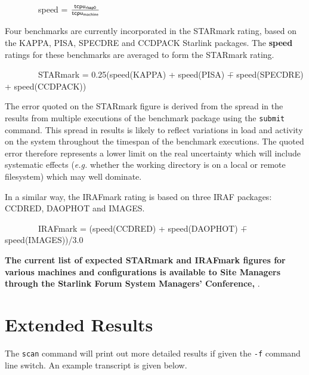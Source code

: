 \vspace{5mm}
\begin{large}
~~~~~~~~speed = $\frac{{\sf tcpu_{rlssp0}}}{{\sf tcpu_{machine}}}$
\end{large}
\vspace{5mm}

Four benchmarks are currently incorporated in the STARmark rating,
based on the KAPPA, PISA, SPECDRE and CCDPACK Starlink packages. The
{\bf speed} ratings for these benchmarks are averaged to form the 
STARmark rating.

\begin{tabbing}
~~~~~~~~STARmark = 0.25(speed(KAPPA) + speed(PISA) \=+ speed(SPECDRE)  \\
                                                     \>+ speed(CCDPACK))
\end{tabbing}

The error quoted on the STARmark figure is derived from the spread in
the results from multiple executions of the benchmark package using the
{\tt submit} command.  This spread in results is likely to reflect
variations in load and activity on the system throughout the timespan
of the benchmark executions. The quoted error therefore represents a
lower limit on the real uncertainty which will include systematic
effects ({\em e.g.} whether the working directory is on a local or
remote filesystem) which may well dominate.

In a similar way, the IRAFmark rating is based on three IRAF
packages: CCDRED, DAOPHOT and IMAGES.

\begin{tabbing}
~~~~~~~~IRAFmark = (speed(CCDRED) + speed(DAOPHOT) \=+ speed(IMAGES))/3.0  \\
\end{tabbing}


{\bf The current list of expected STARmark and IRAFmark figures for various
machines and configurations is available to Site Managers through the
Starlink Forum System Managers' Conference, }.


\section{Extended Results}
\label{results}

The {\tt scan} command will print out more detailed results if given
the {\tt -f} command line switch. An example transcript is given below.
 

